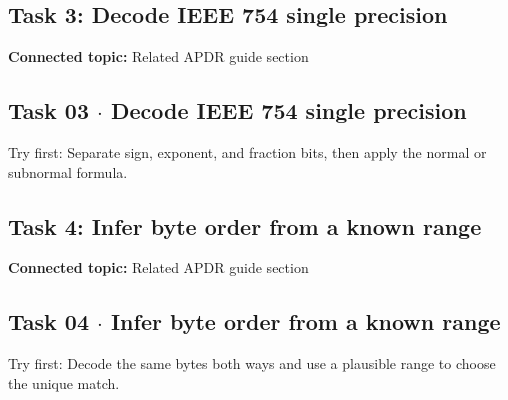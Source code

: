 \documentclass[11pt]{article}
\begin{document}
\begin{keepsection}
\section{Task 3: Decode IEEE 754 single precision}

\textbf{Connected topic:} Related APDR guide section

\begin{keepsection}
\subsection{Task 03 \ensuremath{\cdot} Decode IEEE 754 single precision}

Try first: Separate sign, exponent, and fraction bits, then apply the normal or subnormal formula.

\end{keepsection}
\end{keepsection}

\begin{keepsection}
\section{Task 4: Infer byte order from a known range}

\textbf{Connected topic:} Related APDR guide section

\begin{keepsection}
\subsection{Task 04 \ensuremath{\cdot} Infer byte order from a known range}

Try first: Decode the same bytes both ways and use a plausible range to choose the unique match.

\end{keepsection}
\end{keepsection}
\end{document}
